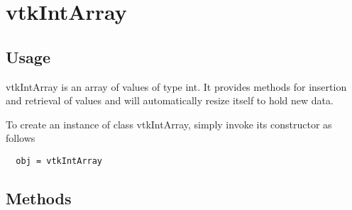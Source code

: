 \section{vtkIntArray}

\subsection{Usage}

 vtkIntArray is an array of values of type int.  It provides
 methods for insertion and retrieval of values and will
 automatically resize itself to hold new data.

To create an instance of class vtkIntArray, simply
invoke its constructor as follows
\begin{verbatim}
  obj = vtkIntArray
\end{verbatim}
\subsection{Methods}


